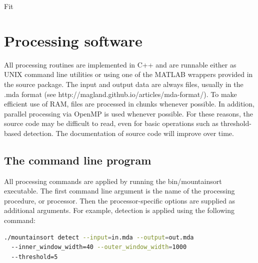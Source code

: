 \documentclass[hidelinks,10pt]{article}
\begin{document}
\begin{algorithm}
\DontPrintSemicolon %

\caption{{\sc Fit}}
\label{algo:fit}
\end{algorithm}


\section {Processing software}

All processing routines are implemented in C++ and are runnable either as UNIX command line utilities or using one of the MATLAB wrappers provided in the source package. The input and output data are always files, usually in the .mda format (see http://magland.github.io/articles/mda-format/). To make efficient use of RAM, files are processed in chunks whenever possible. In addition, parallel processing via OpenMP is used whenever possible. For these reasons, the source code may be difficult to read, even for basic operations such as threshold-based detection. The documentation of source code will improve over time.

\subsection {The command line program}

All processing commands are applied by running the bin/mountainsort executable. The first command line argument is the name of the processing procedure, or processor. Then the processor-specific options are supplied as additional arguments. For example, detection is applied using the following command:

\begin{lstlisting}[language=bash]
./mountainsort detect --input=in.mda --output=out.mda
  --inner_window_width=40 --outer_window_width=1000
  --threshold=5
\end{lstlisting}
\end{document}
